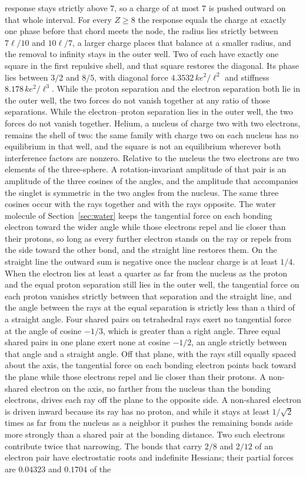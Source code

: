 \documentclass[a4paper]{article}
\begin{document}
response stays strictly above \(7\), so a charge of at most \(7\) is pushed outward on that whole interval. For every \(Z\ge 8\) the response equals the charge at exactly one phase before that chord meets the node, the radius lies strictly between \(7\ell/10\) and \(10\ell/7\), a larger charge places that balance at a smaller radius, and the removal to infinity stays in the outer well. Two of each have exactly one square in the first repulsive shell, and that square restores the diagonal. Its phase lies between \(3/2\) and \(8/5\), with diagonal force \(4.3532\,k e^{2}/\ell^{2}\) and stiffness \(8.178\,k e^{2}/\ell^{3}\). While the proton separation and the electron separation both lie in the outer well, the two forces do not vanish together at any ratio of those separations. While the electron--proton separation lies in the outer well, the two forces do not vanish together. Helium, a nucleus of charge two with two electrons, remains the shell of two: the same family with charge two on each nucleus has no equilibrium in that well, and the square is not an equilibrium wherever both interference factors are nonzero. Relative to the nucleus the two electrons are two elements of the three-sphere. A rotation-invariant amplitude of that pair is an amplitude of the three cosines of the angles, and the amplitude that accompanies the singlet is symmetric in the two angles from the nucleus. The same three cosines occur with the rays together and with the rays opposite. The water molecule of Section~\ref{sec:water} keeps the tangential force on each bonding electron toward the wider angle while those electrons repel and lie closer than their protons, so long as every further electron stands on the ray or repels from the side toward the other bond, and the straight line restores them. On the straight line the outward sum is negative once the nuclear charge is at least \(1/4\). When the electron lies at least a quarter as far from the nucleus as the proton and the equal proton separation still lies in the outer well, the tangential force on each proton vanishes strictly between that separation and the straight line, and the angle between the rays at the equal separation is strictly less than a third of a straight angle. Four shared pairs on tetrahedral rays exert no tangential force at the angle of cosine \(-1/3\), which is greater than a right angle. Three equal shared pairs in one plane exert none at cosine \(-1/2\), an angle strictly between that angle and a straight angle. Off that plane, with the rays still equally spaced about the axis, the tangential force on each bonding electron points back toward the plane while those electrons repel and lie closer than their protons. A non-shared electron on the axis, no farther from the nucleus than the bonding electrons, drives each ray off the plane to the opposite side. A non-shared electron is driven inward because its ray has no proton, and while it stays at least \(1/\sqrt{2}\) times as far from the nucleus as a neighbor it pushes the remaining bonds aside more strongly than a shared pair at the bonding distance. Two such electrons contribute twice that narrowing. The bonds that carry \(2/8\) and \(2/12\) of an electron pair have electrostatic roots and indefinite Hessians; their partial forces are \(0.04323\) and \(0.1704\) of the 
\end{document}
